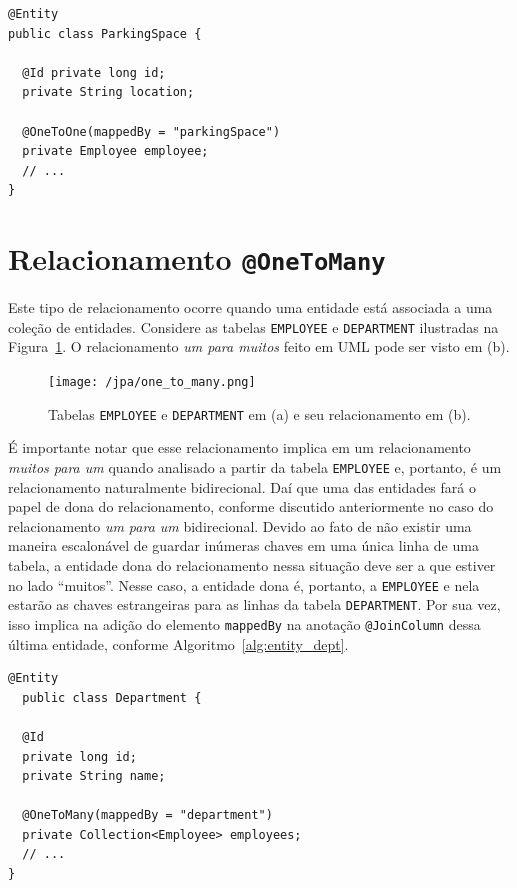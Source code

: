 \documentclass[
  10.5pt,				  %
	openright,			%
	twoside,			  %
  a5paper,
  chapter=TITLE,	%
	section=TITLE,	%
  hyphens,        %
	english,        %
	brazil          %
]{abntex2}
\begin{document}
\begin{lstlisting}[caption={Classe ParkingSpace e seus relacionamentos.}, label={alg:entity_employee_bi}]
@Entity
public class ParkingSpace {
  
  @Id private long id;
  private String location;

  @OneToOne(mappedBy = "parkingSpace")
  private Employee employee;
  // ...
}
\end{lstlisting}
%

\section{Relacionamento \texttt{@OneToMany}}

Este tipo de relacionamento ocorre quando uma entidade está associada a uma coleção de entidades. Considere as tabelas \texttt{EMPLOYEE} e \texttt{DEPARTMENT} ilustradas na Figura~\ref{fig:jpa_onetomany}. O relacionamento \emph{um para muitos} feito em UML pode ser visto em (b).

\begin{figure}[!ht]
  \caption{\label{fig:jpa_onetomany} Tabelas \texttt{EMPLOYEE} e \texttt{DEPARTMENT} em (a) e seu relacionamento em (b).}
  \begin{center}
    \texttt{[image: /jpa/one\_to\_many.png]}
  \end{center}
\end{figure}


É importante notar que esse relacionamento implica em um relacionamento \emph{muitos para um} quando analisado a partir da tabela \texttt{EMPLOYEE} e, portanto, é um relacionamento naturalmente bidirecional. Daí que uma das entidades fará o papel de dona do relacionamento, conforme discutido anteriormente no caso do relacionamento \emph{um para um} bidirecional. Devido ao fato de não existir uma maneira escalonável de guardar inúmeras chaves em uma única linha de uma tabela, a entidade dona do relacionamento nessa situação deve ser a que estiver no lado ``muitos''. Nesse caso, a entidade dona é, portanto, a \texttt{EMPLOYEE} e nela estarão as chaves estrangeiras para as linhas da tabela \texttt{DEPARTMENT}. Por sua vez, isso implica na adição do elemento \texttt{mappedBy} na anotação \texttt{@JoinColumn} dessa última entidade, conforme Algoritmo~\ref{alg:entity_dept}.

\begin{lstlisting}[caption={Classe Department e seus relacionamentos.}, label={alg:entity_dept}]
@Entity
  public class Department {

  @Id
  private long id;
  private String name;

  @OneToMany(mappedBy = "department")
  private Collection<Employee> employees;
  // ...
}
\end{lstlisting}
%
\end{document}
